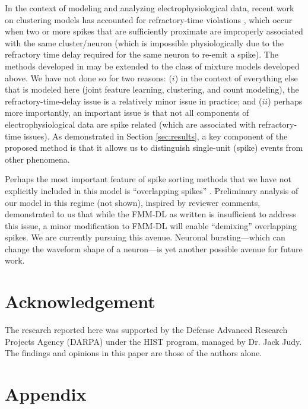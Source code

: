\documentclass[journal]{IEEEtran}
\begin{document}
In the context of modeling and analyzing electrophysiological data, recent work on clustering models has accounted for refractory-time
violations \cite{Wood2009,Calabrese2010,Bo2011}, which occur when two or more spikes that
are sufficiently proximate are improperly associated with the same
cluster/neuron (which is impossible physiologically due to the refractory time delay
required for the same neuron to re-emit a spike). The methods developed in \cite{Wood2009,Bo2011} may be extended to the class of mixture models developed above. We have not done so for two reasons: ($i$) in the context of everything else that is modeled here (joint feature learning, clustering, and count modeling), the refractory-time-delay issue is a relatively minor issue in practice; and ($ii$) perhaps more importantly, an important issue is that not all components of electrophysiological data are spike related (which are associated with refractory-time issues). As demonstrated in Section \ref{sec:results}, a key component of the proposed method is that it allows us to distinguish single-unit (spike) events from other phenomena.


Perhaps the most important feature of spike sorting methods that we have not explicitly included in this model is ``overlapping spikes'' \cite{Bar-Gad2001, Zhang2004, Wang2006, Vargas-Irwin2007, Herbst2008a, Adamos2010, Franke2010b}. Preliminary analysis of our model in this regime (not shown), inspired by reviewer comments, demonstrated to us that while the FMM-DL as written is insufficient to address this issue, a minor modification to FMM-DL will enable ``demixing'' overlapping spikes.  We are currently pursuing this avenue.  Neuronal bursting---which can change the waveform shape of a neuron---is yet another possible avenue for future work.  

\section*{Acknowledgement} The research reported here was supported by the Defense Advanced Research Projects Agency (DARPA) under the HIST program, managed by Dr. Jack Judy. The findings and opinions in this paper are those of the authors alone.

\section*{Appendix} \label{sec:appendix}

\setcounter{subsection}{0}
\end{document}
